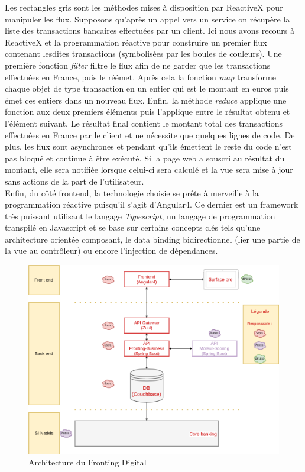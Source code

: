 	Les rectangles gris sont les méthodes mises à disposition par ReactiveX pour manipuler les flux. Supposons qu'après un appel vers un service on récupère la liste des transactions bancaires effectuées par un client. Ici nous avons recours à ReactiveX et la programmation réactive pour construire un premier flux contenant lesdites transactions (symbolisées par les boules de couleurs). Une première fonction \textit{filter} filtre le flux afin de ne garder que les transactions effectuées en France, puis le réémet. Après cela la fonction \textit{map} transforme chaque objet de type transaction en un entier qui est le montant en euros puis émet ces entiers dans un nouveau flux. Enfin, la méthode \textit{reduce} applique une fonction aux deux premiers éléments puis l'applique entre le résultat obtenu et l'élément suivant. Le résultat final contient le montant total des transactions effectuées en France par le client et ne nécessite que quelques lignes de code. De plus, les flux sont asynchrones et pendant qu'ils émettent le reste du code n'est pas bloqué et continue à être exécuté. Si la page web a souscri au résultat du montant, elle sera notifiée lorsque celui-ci sera calculé et la vue sera mise à jour sans actions de la part de l'utilisateur. \\

	Enfin, du côté frontend, la technologie choisie se prête à merveille à la programmation réactive puisqu'il s'agit d'Angular4. Ce dernier est un framework très puissant utilisant le langage \textit{Typescript}, un langage de programmation transpilé en Javascript et se base sur certains concepts clés tels qu'une architecture orientée composant, le data binding bidirectionnel (lier une partie de la vue au contrôleur) ou encore l'injection de dépendances.

\begin{figure}[h!]
	\includegraphics[scale=0.50]{images/travailBP1818/architecture/archiFonc.png}
	\centering
	\caption{Architecture du Fronting Digital}
	\label{archiFoncBP1818}
\end{figure}

